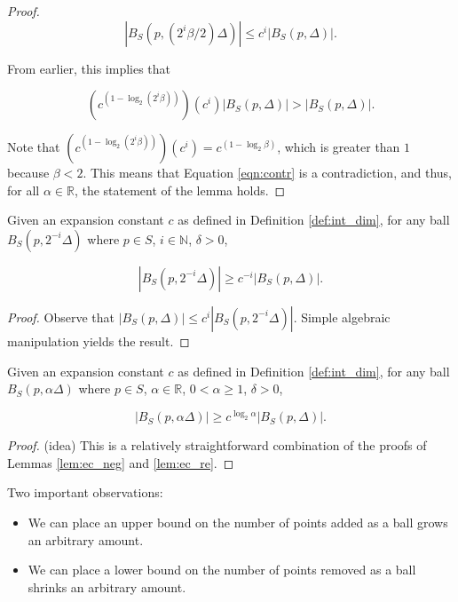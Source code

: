 \begin{proof}
\begin{equation}
|B_S(p, (2^i\beta / 2) \Delta)| \le c^i | B_S(p, \Delta) |.
\end{equation}

From earlier, this implies that

\begin{equation}
\label{eqn:contr}
(c^{(1 - \log_2 (2^i \beta))}) (c^i) |B_S(p, \Delta) | > |B_S(p, \Delta) |.
\end{equation}

Note that $(c^{(1 - \log_2 (2^i \beta))}) (c^i) = c^{(1 - \log_2 \beta)}$, which
is greater than $1$ because $\beta < 2$.  This means that Equation
\ref{eqn:contr} is a contradiction, and thus, for all $\alpha \in \mathbb{R}$,
the statement of the lemma holds.
\end{proof}

\begin{lemma}
\label{lem:ec_neg}
Given an expansion constant $c$ as defined in Definition \ref{def:int_dim}, for
any ball $B_S(p, 2^{-i} \Delta)$ where $p \in S$, $i \in \mathbb{N}$, $\delta >
0$,

\begin{equation}
|B_S(p, 2^{-i} \Delta)| \ge c^{-i} |B_S(p, \Delta)|.
\end{equation}
\end{lemma}

\begin{proof}
Observe that $|B_S(p, \Delta)| \le c^i |B_S(p, 2^{-i} \Delta)|$.  Simple
algebraic manipulation yields the result.
\end{proof}

\begin{lemma}
Given an expansion constant $c$ as defined in Definition \ref{def:int_dim}, for
any ball $B_S(p, \alpha \Delta)$ where $p \in S$, $\alpha \in \mathbb{R}$,
$0 < \alpha \ge 1$, $\delta > 0$,

\begin{equation}
|B_S(p, \alpha \Delta)| \ge c^{\log_2 \alpha} |B_S(p, \Delta)|.
\end{equation}
\end{lemma}

\begin{proof}
(idea) This is a relatively straightforward combination of the proofs of
Lemmas \ref{lem:ec_neg} and \ref{lem:ec_re}.
\end{proof}

Two important observations:

\begin{itemize}
  \item We can place an upper bound on the number of points added as a ball
grows an arbitrary amount.

  \item We can place a lower bound on the number of points removed as a ball
shrinks an arbitrary amount.
\end{itemize}
